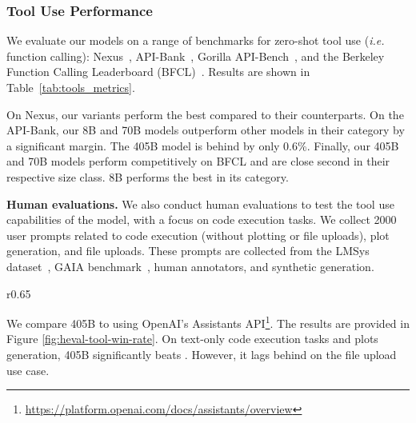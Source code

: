 \subsubsection{Tool Use Performance}
\label{subsubsec:tool_use_evals}

We evaluate our models on a range of benchmarks for zero-shot tool use (\emph{i.e.} function calling): Nexus~\citep{srinivasan2023nexusraven}, API-Bank~\citep{li2023api}, Gorilla API-Bench~\citep{patil2023gorilla}, and the Berkeley Function Calling Leaderboard (BFCL)~\citep{berkeley-function-calling-leaderboard}. Results are shown in Table~\ref{tab:tools_metrics}.

On Nexus, our \llamathree variants perform the best compared to their counterparts. On the API-Bank, our \llamathree 8B and 70B models outperform other models in their category by a significant margin. The 405B model is behind \sonnet by only 0.6\%. Finally, our 405B and 70B models perform competitively on BFCL and are close second in their respective size class. \llamathree 8B performs the best in its category.

\textbf{Human evaluations.}
We also conduct human evaluations to test the tool use capabilities of the model, with a focus on code execution tasks. We collect 2000 user prompts related to code execution (without plotting or file uploads), plot generation, and file uploads. These prompts are collected from the LMSys dataset~\citep{chiang2024chatbot}, GAIA benchmark~\citep{mialon2023gaia}, human annotators, and synthetic generation.

\begin{wraptable}{r}{0.65\textwidth}
  
  \caption{\label{tab:tools_metrics} \textbf{Zero-shot tool use benchmarks.} We report function calling accuracy across Nexus~\citep{srinivasan2023nexusraven}, API-Bank~\citep{li2023api}, API-Bench~\citep{patil2023gorilla}, and BFCL~\citep{berkeley-function-calling-leaderboard}.%
  \vspace{-8mm}}
\end{wraptable}

We compare \llamathree 405B to \gpto using OpenAI's Assistants API\footnote{\url{https://platform.openai.com/docs/assistants/overview}}.
The results are provided in Figure \ref{fig:heval-tool-win-rate}. On text-only code execution tasks and plots generation, \llamathree 405B significantly beats \gpto. However, it lags behind on the file upload use case.



